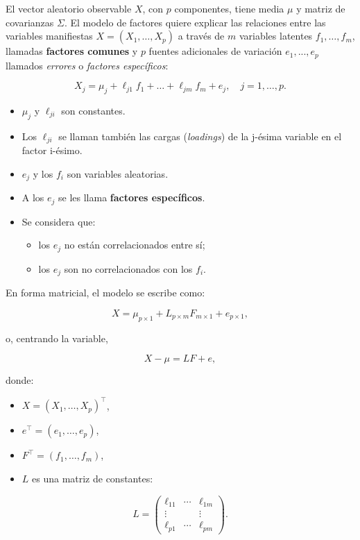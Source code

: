 \documentclass[
]{book}
\begin{document}
El vector aleatorio observable \(X\), con \(p\) componentes, tiene media \(\mu\) y matriz de covarianzas \(\Sigma\). El modelo de factores quiere explicar las relaciones entre las variables manifiestas \(X=(X_1, \dots, X_p)\) a través de \(m\) variables latentes \(f_1, \dots, f_m\), llamadas \textbf{factores comunes} y \(p\) fuentes adicionales de variación \(e_1,...,e_p\) llamados \emph{errores} o \emph{factores específicos}:

\[
X_j = \mu_j + \ell_{j1} f_1 + \dots + \ell_{jm} f_m + e_j, \quad j = 1, \dots, p.
\]

\begin{itemize}
\item
  \(\mu_j\) y \(\ell_{ji}\) son constantes.
\item
  Los \(\ell_{ji}\) se llaman también las cargas (\emph{loadings}) de la j-ésima variable en el factor i-ésimo.
\item
  \(e_j\) y los \(f_i\) son variables aleatorias.
\item
  A los \(e_j\) se les llama \textbf{factores específicos}.
\item
  Se considera que:

  \begin{itemize}
  \item
    los \(e_j\) no están correlacionados entre sí;
  \item
    los \(e_j\) son no correlacionados con los \(f_i\).
  \end{itemize}
\end{itemize}

En forma matricial, el modelo se escribe como:

\[ X = \mu_{p\times 1} + L_{p\times m} F_{m\times 1} + e_{p\times 1},
\]

o, centrando la variable,

\[
X - \mu = L F + e,
\]

donde:

\begin{itemize}
\item
  \(X = (X_1, \dots, X_p)^\top\),
\item
  \(e^\top = (e_1, \dots, e_p)\),
\item
  \(F^\top = (f_1, \dots, f_m)\),
\item
  \(L\) es una matriz de constantes:
\end{itemize}

\[
L =
\begin{pmatrix}
\ell_{11} & \cdots & \ell_{1m} \\
\vdots       &        & \vdots       \\
\ell_{p1} & \cdots & \ell_{pm}
\end{pmatrix}.
\]
\end{document}
